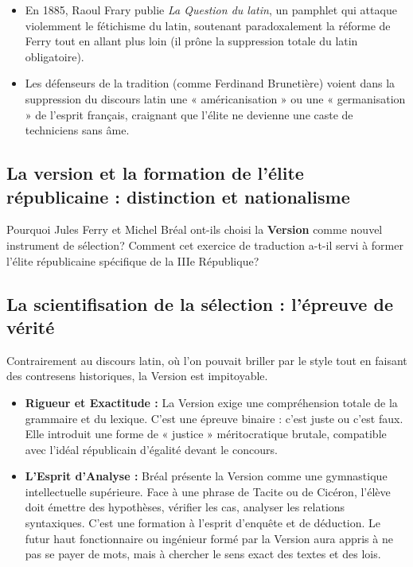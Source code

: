 \begin{itemize}\item En 1885, Raoul Frary publie \textit{La Question du latin}, un pamphlet qui attaque violemment le fétichisme du latin, soutenant paradoxalement la réforme de Ferry tout en allant plus loin (il prône la suppression totale du latin obligatoire).\cite{I-1-2-ref28}\item Les défenseurs de la tradition (comme Ferdinand Brunetière) voient dans la suppression du discours latin une « américanisation » ou une « germanisation » de l'esprit français, craignant que l'élite ne devienne une caste de techniciens sans âme.\cite{I-1-2-ref2}\end{itemize}

\subsection{La version et la formation de l'élite républicaine : distinction et nationalisme}

Pourquoi Jules Ferry et Michel Bréal ont-ils choisi la \textbf{Version} comme nouvel instrument de
sélection? Comment cet exercice de traduction a-t-il servi à former l'élite républicaine spécifique
de la IIIe République?



\subsection{La scientifisation de la sélection : l'épreuve de vérité}

Contrairement au discours latin, où l'on pouvait briller par le style tout en faisant des contresens
historiques, la Version est impitoyable.

\begin{itemize}\item \textbf{Rigueur et Exactitude :} La Version exige une compréhension totale de la grammaire et du lexique. C'est une épreuve binaire : c'est juste ou c'est faux. Elle introduit une forme de « justice » méritocratique brutale, compatible avec l'idéal républicain d'égalité devant le concours.\cite{I-1-2-ref22}\item \textbf{L'Esprit d'Analyse :} Bréal présente la Version comme une gymnastique intellectuelle supérieure. Face à une phrase de Tacite ou de Cicéron, l'élève doit émettre des hypothèses, vérifier les cas, analyser les relations syntaxiques. C'est une formation à l'esprit d'enquête et de déduction. Le futur haut fonctionnaire ou ingénieur formé par la Version aura appris à ne pas se payer de mots, mais à chercher le sens exact des textes et des lois.\cite{I-1-2-ref21}\end{itemize}

